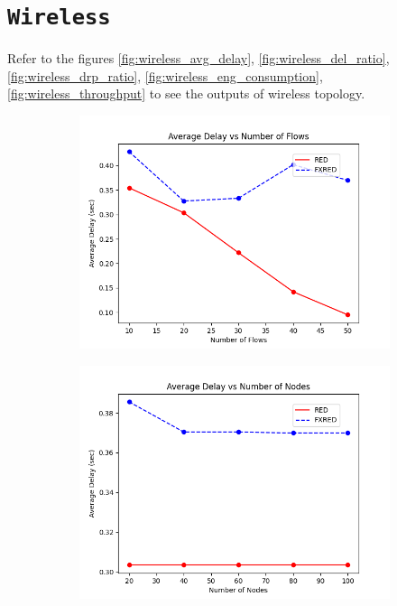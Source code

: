 \documentclass[10pt]{report}
\begin{document}
\section*{\textbf{\texttt{Wireless}}}
Refer to the figures \ref{fig:wireless_avg_delay}, \ref{fig:wireless_del_ratio}, \ref{fig:wireless_drp_ratio}, \ref{fig:wireless_eng_consumption}, \ref{fig:wireless_throughput} to see the outputs of wireless topology.
\begin{figure}
    \centering
    \begin{subfigure}{.5\textwidth}
        \includegraphics[width=1\linewidth]{static/graphs/wireless/Average Delay vs Number of Flows.png}
    \end{subfigure}%
    \begin{subfigure}{.5\textwidth}
        \includegraphics[width=1\linewidth]{static/graphs/wireless/Average Delay vs Number of Nodes.png}

\end{subfigure}
\end{figure}
\end{document}
